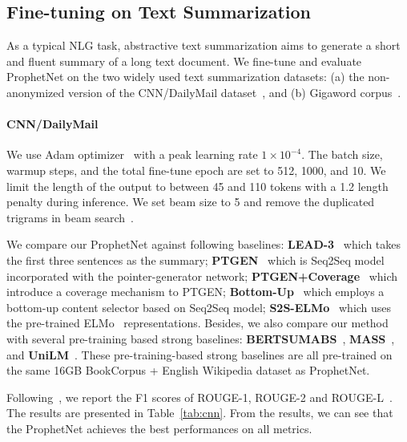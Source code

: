 \documentclass[11pt,a4paper]{article}
\begin{document}
\subsection{Fine-tuning on Text Summarization}\label{sec:exp2}
As a typical NLG task, abstractive text summarization aims to generate a short and fluent summary of a long text document.
We fine-tune and evaluate ProphetNet on the two widely used text summarization datasets: (a) the non-anonymized version of the CNN/DailyMail dataset~\cite{see2017get}, and (b) Gigaword corpus~\cite{rush2015neural}.

\paragraph{CNN/DailyMail} 
We use Adam optimizer~\cite{kingma2014adam} with a peak learning rate $1 \times 10^{-4}$.
The batch size, warmup steps, and the total fine-tune epoch are set to 512, 1000, and 10. 
We limit the length of the output to between 45 and 110 tokens with a 1.2 length penalty during inference. 
We set beam size to 5 and remove the duplicated trigrams in beam search~\cite{fan2017controllable}. 

We compare our ProphetNet against following baselines:
\textbf{LEAD-3}~\cite{nallapati2016abstractive} which takes the first three sentences as the summary;
\textbf{PTGEN}~\cite{see2017get} which is Seq2Seq model incorporated with the pointer-generator network;
\textbf{PTGEN+Coverage}~\cite{see2017get} which introduce a coverage mechanism to PTGEN;
\textbf{Bottom-Up}~\cite{gehrmann2018bottom} which employs a bottom-up content selector based on Seq2Seq model;
\textbf{S2S-ELMo}~\cite{edunov2019pre} which uses the pre-trained ELMo~\cite{peters2018deep} representations.
Besides, we also compare our method with several pre-training based strong baselines: \textbf{BERTSUMABS}~\cite{liu2019text}, \textbf{MASS}~\cite{song2019mass}, and \textbf{UniLM}~\cite{dong2019unified}. 
These pre-training-based strong baselines are all pre-trained on the same 16GB BookCorpus + English Wikipedia dataset as ProphetNet. 

Following~\citet{see2017get}, we report the F1 scores of ROUGE-1, ROUGE-2 and ROUGE-L~\cite{lin2004rouge}.~\citet{du2017learning}
The results are presented in Table~\ref{tab:cnn}.
From the results, we can see that the ProphetNet achieves the best performances on all metrics.
\end{document}
